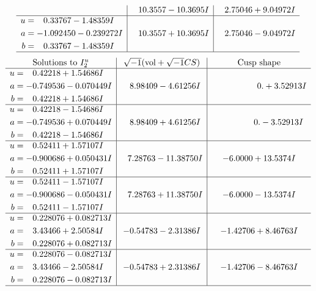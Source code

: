 \documentclass[1p]{elsarticle_modified}
\theoremstyle{definition}
\newcommand{\I}{\sqrt{-1}}
\begin{document}
$$\begin{array}{c|c|c}
 & \phantom{-}10.3557 - 10.3695 I & \phantom{-}2.75046 + 9.04972 I \\ \hline\begin{aligned}
u &= \phantom{-}0.33767 - 1.48359 I \\
a &= -1.092450 - 0.239272 I \\
b &= \phantom{-}0.33767 - 1.48359 I\end{aligned}
 & \phantom{-}10.3557 + 10.3695 I & \phantom{-}2.75046 - 9.04972 I\\
 \hline 
 \end{array}$$\newpage$$\begin{array}{c|c|c}  
\text{Solutions to }I^u_{2}& \I (\text{vol} + \sqrt{-1}CS) & \text{Cusp shape}\\
 \hline 
\begin{aligned}
u &= \phantom{-}0.42218 + 1.54686 I \\
a &= -0.749536 - 0.070449 I \\
b &= \phantom{-}0.42218 + 1.54686 I\end{aligned}
 & \phantom{-}8.98409 - 4.61256 I & \phantom{-0.000000 -}0. + 3.52913 I \\ \hline\begin{aligned}
u &= \phantom{-}0.42218 - 1.54686 I \\
a &= -0.749536 + 0.070449 I \\
b &= \phantom{-}0.42218 - 1.54686 I\end{aligned}
 & \phantom{-}8.98409 + 4.61256 I & \phantom{-0.000000 } 0. - 3.52913 I \\ \hline\begin{aligned}
u &= \phantom{-}0.52411 + 1.57107 I \\
a &= -0.900686 + 0.050431 I \\
b &= \phantom{-}0.52411 + 1.57107 I\end{aligned}
 & \phantom{-}7.28763 - 11.38750 I & -6.0000 + 13.5374 I \\ \hline\begin{aligned}
u &= \phantom{-}0.52411 - 1.57107 I \\
a &= -0.900686 - 0.050431 I \\
b &= \phantom{-}0.52411 - 1.57107 I\end{aligned}
 & \phantom{-}7.28763 + 11.38750 I & -6.0000 - 13.5374 I \\ \hline\begin{aligned}
u &= \phantom{-}0.228076 + 0.082713 I \\
a &= \phantom{-}3.43466 + 2.50584 I \\
b &= \phantom{-}0.228076 + 0.082713 I\end{aligned}
 & -0.54783 - 2.31386 I & -1.42706 + 8.46763 I \\ \hline\begin{aligned}
u &= \phantom{-}0.228076 - 0.082713 I \\
a &= \phantom{-}3.43466 - 2.50584 I \\
b &= \phantom{-}0.228076 - 0.082713 I\end{aligned}
 & -0.54783 + 2.31386 I & -1.42706 - 8.46763 I\\
 \hline 
 \end{array}$$\newpage\newpage\renewcommand{\arraystretch}{1}
\end{document}
